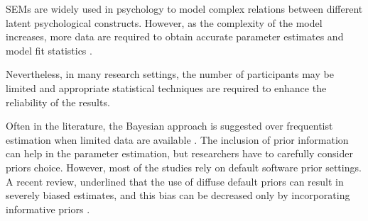 \documentclass[graybox]{svmult}
\begin{document}
SEMs are widely used in psychology to model complex relations between different latent psychological constructs. However, as the complexity of the model increases, more data are required to obtain accurate parameter estimates and model fit statistics \cite{wolfSampleSizeRequirements2013}.

Nevertheless, in many research settings, the number of participants may be limited and appropriate statistical techniques are required to enhance the reliability of the results.

Often in the literature, the Bayesian approach is suggested over frequentist estimation when limited data are available \cite{mcneishUsingBayesianMethods2016a}.  The inclusion of prior information can help in the parameter estimation, but researchers have to carefully consider priors choice.
However, most of the studies rely on default software prior settings. A recent review, underlined that the use of diffuse default priors can result in severely biased estimates, and this bias can be decreased only by incorporating informative priors \cite{smidBayesianFrequentistEstimation2020}.
\end{document}
